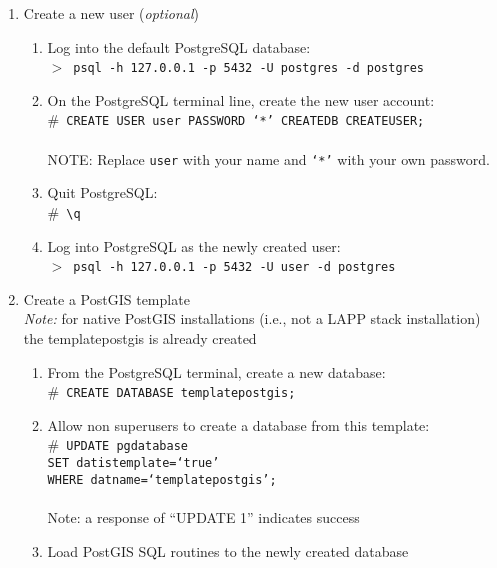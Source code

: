\begin{enumerate}
    \item Create a new user (\emph{optional})
    \begin{enumerate}
        \item Log into the default PostgreSQL database:\\ 
              $>$~\texttt{psql -h 127.0.0.1 -p 5432 -U postgres -d postgres}
        \item On the PostgreSQL terminal line, create the new user account:\\ 
              $\#$~\texttt{CREATE USER user PASSWORD `*' CREATEDB CREATEUSER;}\\
              \\
              NOTE: Replace \texttt{user} with your name and 
              \texttt{`*'} with your own password.
        \item Quit PostgreSQL:\\ 
              $\#$~\texttt{\textbackslash q}
        \item Log into PostgreSQL as the newly created user:\\ 
              $>$~\texttt{psql -h 127.0.0.1 -p 5432 -U user -d postgres}
    \end{enumerate}
    \item Create a PostGIS template\\
          \emph{Note:} for native PostGIS installations (i.e., not a LAPP 
          stack installation) the template\textunderscore postgis is already 
          created
    \begin{enumerate}
        \item From the PostgreSQL terminal, create a new database:\\ 
              $\#$~\texttt{CREATE DATABASE template\textunderscore postgis;}
        \item Allow non superusers to create a database from this template:\\ 
              $\#$~\texttt{UPDATE pg\textunderscore database\\ 
              SET datistemplate=`true'\\ 
              WHERE datname=`template\textunderscore postgis';}\\
              \\
              Note: a response of ``UPDATE 1'' indicates success
        \item Load PostGIS SQL routines to the newly created database
        \begin{enumerate}

\end{enumerate}
\end{enumerate}
\end{enumerate}
